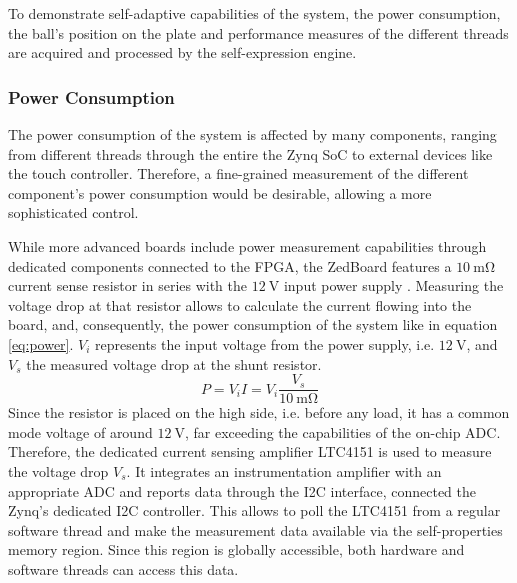 To demonstrate self-adaptive capabilities of the system, the power
consumption, the ball's position on the plate and performance measures of the
different threads are acquired and processed by the self-expression engine.

\subsubsection{Power Consumption}
\label{sssec:power}
The power consumption of the system is affected by many components, ranging
from different threads through the entire the Zynq \ac{SoC} to external
devices like the touch controller. Therefore, a fine-grained measurement of
the different component's power consumption would be desirable, allowing a
more sophisticated control.

While more advanced boards include power measurement capabilities through
dedicated components connected to the FPGA, the ZedBoard features a
$\SI{10}{\milli\ohm}$ current sense resistor in series with the
$\SI{12}{\volt}$ input power supply \citep{ZedBoard}. Measuring the voltage
drop at that resistor allows to calculate the current flowing into the board,
and, consequently, the power consumption of the system like in equation
\ref{eq:power}. $V_i$ represents the input voltage from the power supply, i.e.
$\SI{12}{\volt}$, and $V_s$ the measured voltage drop at the shunt resistor.
\begin{equation}
P = V_i I = V_i \frac{V_s}{\SI{10}{\milli\ohm}}
\label{eq:power}
\end{equation}
Since the resistor is placed on the high side, i.e. before any load, it has a
common mode voltage of around $\SI{12}{\volt}$, far exceeding the capabilities
of the on-chip \ac{ADC}. Therefore, the dedicated current sensing amplifier
LTC4151 is used to measure the voltage drop $V_s$. It integrates an
instrumentation amplifier with an appropriate \ac{ADC} and reports data
through the \ac{I2C} interface, connected the Zynq's dedicated \ac{I2C}
controller. This allows to poll the LTC4151 from a regular software thread and
make the measurement data available via the self-properties memory region.
Since this region is globally accessible, both hardware and software threads
can access this data.

